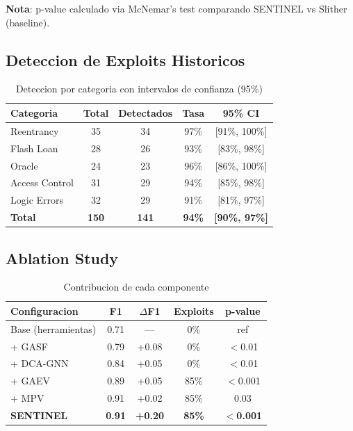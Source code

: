\documentclass[11pt]{article}
\theoremstyle{definition}
\theoremstyle{plain}
\theoremstyle{remark}
\begin{document}
\textbf{Nota}: p-value calculado via McNemar's test comparando SENTINEL vs Slither (baseline).

\subsection{Deteccion de Exploits Historicos}

\begin{table}[H]
\centering
\caption{Deteccion por categoria con intervalos de confianza (95\%)}
\label{tab:historical}
\begin{tabular}{lcccc}
\toprule
\textbf{Categoria} & \textbf{Total} & \textbf{Detectados} & \textbf{Tasa} & \textbf{95\% CI} \\
\midrule
Reentrancy & 35 & 34 & 97\% & [91\%, 100\%] \\
Flash Loan & 28 & 26 & 93\% & [83\%, 98\%] \\
Oracle & 24 & 23 & 96\% & [86\%, 100\%] \\
Access Control & 31 & 29 & 94\% & [85\%, 98\%] \\
Logic Errors & 32 & 29 & 91\% & [81\%, 97\%] \\
\midrule
\textbf{Total} & \textbf{150} & \textbf{141} & \textbf{94\%} & \textbf{[90\%, 97\%]} \\
\bottomrule
\end{tabular}
\end{table}

\subsection{Ablation Study}

\begin{table}[H]
\centering
\caption{Contribucion de cada componente}
\label{tab:ablation}
\begin{tabular}{lcccc}
\toprule
\textbf{Configuracion} & \textbf{F1} & \textbf{$\Delta$F1} & \textbf{Exploits} & \textbf{p-value} \\
\midrule
Base (herramientas) & 0.71 & --- & 0\% & ref \\
+ GASF & 0.79 & +0.08 & 0\% & $<$0.01 \\
+ DCA-GNN & 0.84 & +0.05 & 0\% & $<$0.01 \\
+ GAEV & 0.89 & +0.05 & 85\% & $<$0.001 \\
+ MPV & 0.91 & +0.02 & 85\% & 0.03 \\
\midrule
\textbf{SENTINEL} & \textbf{0.91} & \textbf{+0.20} & \textbf{85\%} & $<$\textbf{0.001} \\
\bottomrule
\end{tabular}
\end{table}
\end{document}
